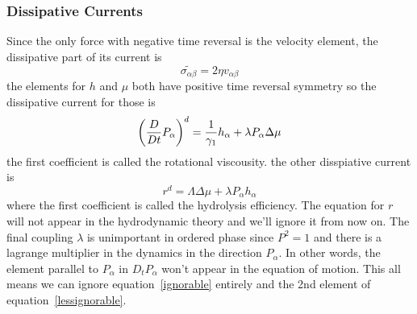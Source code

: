 \subsubsection{Dissipative Currents}
Since the only force with negative time reversal is the velocity element, the dissipative part of its current is
\begin{equation}
    \tilde{\sigma_{\alpha\beta}} = 2\eta v_{\alpha\beta}
\end{equation}
the elements for \(h\) and \(\mu\) both have positive time reversal symmetry so the dissipative current for those is
\begin{equation}\label{lessignorable}
    \left(\frac{D}{Dt}P_\alpha\right)^d = \frac{1}{\gamma_1}h_\alpha + \lambda P_\alpha\Delta\mu
\end{equation}
the first coefficient is called the rotational viscousity. the other disspiative current is
\begin{equation}\label{ignorable}
    r^d = \Lambda \Delta\mu + \lambda P_\alpha h_\alpha
\end{equation}
where the first coefficient is called the hydrolysis efficiency. The equation for \(r\) will not appear in the hydrodynamic theory and we'll ignore it from now on. The final coupling \(\lambda\) is unimportant in ordered phase since \(P^2=1\) and there is a lagrange multiplier in the dynamics in the direction \(P_\alpha\). In other words, the element parallel to \(P_\alpha\) in \(D_t P_\alpha\) won't appear in the equation of motion. This all means we can ignore equation~\ref{ignorable} entirely and the 2nd element of equation~\ref{lessignorable}.